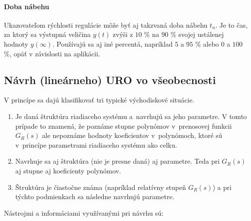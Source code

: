 \documentclass[a4paper, 10pt, ]{article}
\begin{document}
\paragraph{Doba nábehu}

Ukazovateľom rýchlosti regulácie môže byť aj takzvaná doba nábehu $t_n$. Je to čas, za ktorý sa výstupná veličina $y(t)$ zvýši z $10$ \% na $90$ \% svojej ustálenej hodnoty $y(\infty)$. Používajú sa aj iné percentá, napríklad $5$ a $95$ \% alebo $0$ a $100$ \%, opäť v závislosti na aplikácii.
















\subsection{Návrh (lineárneho) URO vo všeobecnosti}

V princípe sa dajú klasifikovať tri typické východiskové situácie.

\begin{enumerate}[leftmargin=0pt, labelsep=4mm, itemsep=0pt]
    \item Je daná štruktúra riadiaceho systému a~navrhujú sa jeho parametre. \newline V tomto prípade to znamená, že poznáme stupne polynómov v~prenosovej funkcii $G_R(s)$ ale nepoznáme hodnoty koeficientov v~polynómoch, ktoré sú v~princípe parametrami riadiaceho systému ako celku.

    \item Navrhuje sa aj štruktúra (nie je presne daná) aj parametre. \newline Teda pri $G_R(s)$ aj stupne aj koeficienty polynómov.

    \item Štruktúra je čiastočne známa (napríklad relatívny stupeň $G_R(s)$) a pri týchto podmienkach sa následne navrhujú parametre.

\end{enumerate}

\noindent
Nástrojmi a informáciami využívanými pri návrhu sú:
\end{document}
